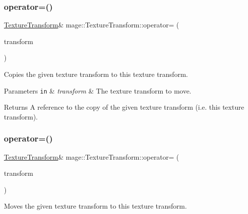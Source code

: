 \subsubsection{\texorpdfstring{operator=()}{operator=()}\hspace{0.1cm}{\footnotesize\ttfamily [1/2]}}
{\footnotesize\ttfamily \hyperlink{structmage_1_1_texture_transform}{Texture\+Transform}\& mage\+::\+Texture\+Transform\+::operator= (\begin{DoxyParamCaption}\item[{const \hyperlink{structmage_1_1_texture_transform}{Texture\+Transform} \&}]{transform }\end{DoxyParamCaption})\hspace{0.3cm}{\ttfamily [default]}}

Copies the given texture transform to this texture transform.


\begin{DoxyParams}[1]{Parameters}
\mbox{\tt in}  & {\em transform} & The texture transform to move. \\
\hline
\end{DoxyParams}
\begin{DoxyReturn}{Returns}
A reference to the copy of the given texture transform (i.\+e. this texture transform). 
\end{DoxyReturn}
\hypertarget{structmage_1_1_texture_transform_a82adfc646b3467f33d92f7f2e24bf28e}{}\label{structmage_1_1_texture_transform_a82adfc646b3467f33d92f7f2e24bf28e} 
\subsubsection{\texorpdfstring{operator=()}{operator=()}\hspace{0.1cm}{\footnotesize\ttfamily [2/2]}}
{\footnotesize\ttfamily \hyperlink{structmage_1_1_texture_transform}{Texture\+Transform}\& mage\+::\+Texture\+Transform\+::operator= (\begin{DoxyParamCaption}\item[{\hyperlink{structmage_1_1_texture_transform}{Texture\+Transform} \&\&}]{transform }\end{DoxyParamCaption})\hspace{0.3cm}{\ttfamily [default]}}

Moves the given texture transform to this texture transform.


